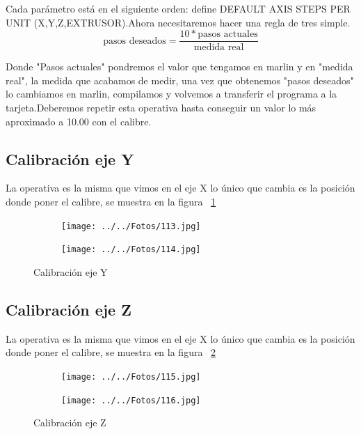 		Cada parámetro está en el siguiente orden: define DEFAULT AXIS STEPS PER UNIT  (X,Y,Z,EXTRUSOR).Ahora necesitaremos hacer una regla de tres simple.\\

			\begin{equation}\label{eq:calibracion}
			\mbox{pasos deseados}=  \frac{10*\mbox{pasos actuales}}{\mbox{medida real}}
			\end{equation}

		Donde "Pasos actuales" pondremos el valor que tengamos en marlin y en "medida real", la medida que acabamos de medir, una vez que obtenemos "pasos deseados" lo cambiamos en marlin, compilamos y volvemos a transferir el programa a la tarjeta.Deberemos repetir esta operativa hasta conseguir un valor lo más aproximado a 10.00 con el calibre.
		
		\subsection{Calibración eje Y}
		La operativa es la misma que vimos en el eje X lo único que cambia es la posición donde poner el calibre, se muestra en la figura ~\ref{fig:3.calibracion}
		\begin{figure}[H]
		        \centering
		        \begin{subfigure}[htb]{0.4\textwidth}
		                \centering
		                \texttt{[image: ../../Fotos/113.jpg]}
		                
		        \end{subfigure}
		        \begin{subfigure}[htb]{0.4\textwidth}
		                \centering
		                \texttt{[image: ../../Fotos/114.jpg]}
		                
		        \end{subfigure}
		        \caption{Calibración eje Y}\label{fig:3.calibracion}
		\end{figure}
		\subsection{Calibración eje Z}
		La operativa es la misma que vimos en el eje X lo único que cambia es la posición donde poner el calibre, se muestra en la figura ~\ref{fig:4.calibracion}
		\begin{figure}[H]
		        \centering
		        \begin{subfigure}[htb]{0.4\textwidth}
		                \centering
		                \texttt{[image: ../../Fotos/115.jpg]}
		                
		        \end{subfigure}
		        \begin{subfigure}[htb]{0.4\textwidth}
		                \centering
		                \texttt{[image: ../../Fotos/116.jpg]}
		                
		        \end{subfigure}
		        \caption{Calibración eje Z}\label{fig:4.calibracion}
		\end{figure}
		
